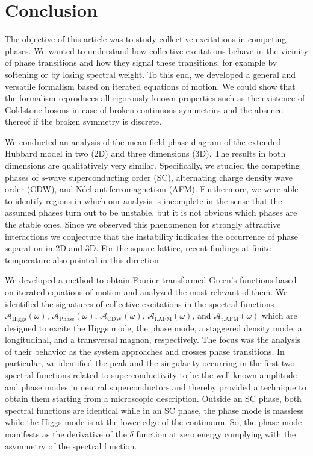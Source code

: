 \documentclass[
    reprint, 
    aps,
    preprintnumbers,
    twocolumn,
    prb,
    superscriptaddress
]{revtex4-2}
\newcommand{\spectral}[1]{\mathcal{A}_\text{#1}  (\omega)}
\begin{document}
\section{Conclusion}\label{sec:conclusion}


The objective of this article was to study collective excitations in competing phases.
We wanted to understand how collective excitations behave in the vicinity of phase transitions
and how they signal these transitions, for example by softening or by losing spectral weight.
To this end, we developed a general and versatile formalism based on iterated equations of motion.
We could show that the formalism reproduces all rigorously known properties such as
the existence of Goldstone bosons in case of broken continuous symmetries and the absence thereof
if the broken symmetry is discrete.

We conducted an analysis of the mean-field phase diagram of the extended Hubbard model in 
two (2D) and three dimensions (3D). The results in both dimensions are qualitatively very similar.
Specifically, we studied the competing phases 
of $s$-wave superconducting order (SC), alternating charge density wave order
(CDW), and N\'eel antiferromagnetism (AFM).
Furthermore, we were able to identify regions in which our analysis is incomplete
in the sense that the assumed phases turn out to be unstable, but it is not obvious which
phases are the stable ones. Since we observed this phenomenon for strongly attractive interactions
we conjecture that the instability indicates the occurrence of phase separation in 2D and 3D. 
For the square lattice, recent findings at finite temperature also pointed in this direction \cite{Linner23}.

We developed a method to obtain Fourier-transformed Green's functions
based on iterated equations of motion and analyzed the most relevant
of them. We identified the signatures of collective excitations in the spectral functions 
$\spectral{Higgs}$, $\spectral{Phase}$, $\spectral{CDW}$, $\spectral{l.AFM}$, and $\spectral{t.AFM}$ 
which are designed to excite the Higgs mode, the phase mode, a staggered density mode, a longitudinal, and a transversal magnon, respectively. 
The focus was the analysis of their behavior as the system approaches and crosses phase transitions.
In particular, we identified the peak and the singularity occurring in the first two 
spectral functions related to superconductivity
to be the well-known amplitude and phase modes in neutral superconductors 
and thereby provided a technique to obtain them starting from a microscopic description.
Outside an SC phase, both spectral functions are identical while in an SC phase,
the phase mode is massless while the Higgs mode is at the lower edge of the continuum.
So, the phase mode manifests as the derivative of the $\delta$ function at zero energy
complying with the asymmetry of the spectral function.
\end{document}
